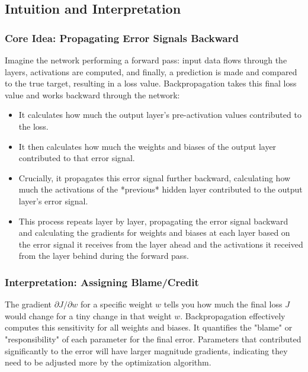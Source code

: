 \documentclass{article}
\begin{document}
\subsection{Intuition and Interpretation}

\subsubsection{Core Idea: Propagating Error Signals Backward}
Imagine the network performing a forward pass: input data flows through the layers, activations are computed, and finally, a prediction is made and compared to the true target, resulting in a loss value. Backpropagation takes this final loss value and works backward through the network:
\begin{itemize}
    \item It calculates how much the output layer's pre-activation values contributed to the loss.
    \item It then calculates how much the weights and biases of the output layer contributed to that error signal.
    \item Crucially, it propagates this error signal further backward, calculating how much the activations of the *previous* hidden layer contributed to the output layer's error signal.
    \item This process repeats layer by layer, propagating the error signal backward and calculating the gradients for weights and biases at each layer based on the error signal it receives from the layer ahead and the activations it received from the layer behind during the forward pass.
\end{itemize}

\subsubsection{Interpretation: Assigning Blame/Credit}
The gradient $\partial J / \partial w$ for a specific weight $w$ tells you how much the final loss $J$ would change for a tiny change in that weight $w$. Backpropagation effectively computes this sensitivity for all weights and biases. It quantifies the "blame" or "responsibility" of each parameter for the final error. Parameters that contributed significantly to the error will have larger magnitude gradients, indicating they need to be adjusted more by the optimization algorithm.
\end{document}

